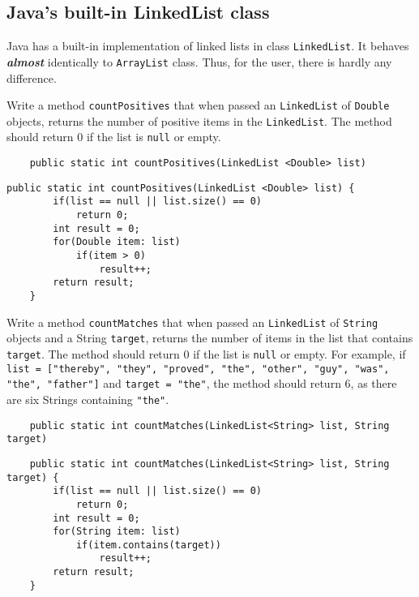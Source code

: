\begin{questions}
\section{Java's built-in LinkedList class}

Java has a built-in implementation of linked lists in class \texttt{LinkedList}. It behaves \textbf{\emph{almost}} identically to \texttt{ArrayList} class. Thus, for the user, there is hardly any difference. 

\question Write a method \texttt{countPositives} that when passed an \texttt{LinkedList} of \texttt{Double} objects, returns the number of positive items in the \texttt{LinkedList}. The method should return 0 if the list is \texttt{null} or empty.

\begin{lstlisting}
	public static int countPositives(LinkedList <Double> list)
\end{lstlisting}

\begin{solution}
\begin{lstlisting}
public static int countPositives(LinkedList <Double> list) {
		if(list == null || list.size() == 0) 
			return 0;
		int result = 0;
		for(Double item: list)
			if(item > 0)
				result++;
		return result;
	}	
\end{lstlisting}	
\end{solution}


\question Write a method \texttt{countMatches} that when passed an \texttt{LinkedList} of \texttt{String} objects and a String \texttt{target}, returns the number of items in the list that contains \texttt{target}. The method should return 0 if the list is \texttt{null} or empty. For example, if \texttt{list = ["thereby", "they", "proved", "the", "other", "guy", "was", "the", "father"]} and \texttt{target = "the"}, the method should return 6, as there are six Strings containing \texttt{"the"}.

\begin{lstlisting}
	public static int countMatches(LinkedList<String> list, String target)
\end{lstlisting}

\begin{solution}
\begin{lstlisting}
	public static int countMatches(LinkedList<String> list, String target) {
		if(list == null || list.size() == 0) 
			return 0;
		int result = 0;
		for(String item: list)
			if(item.contains(target))			
				result++;
		return result;
	}	
\end{lstlisting}	
\end{solution}


\end{questions}
